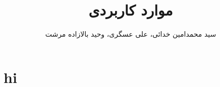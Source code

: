 \documentclass[11pt]{article}
\title{
موارد کاربردی
}
\author{سید محمد‌امین خدائی، علی عسگری، وحید بالازاده مرشت}
\begin{document}
\maketitle
\section{hi}
\end{document}
